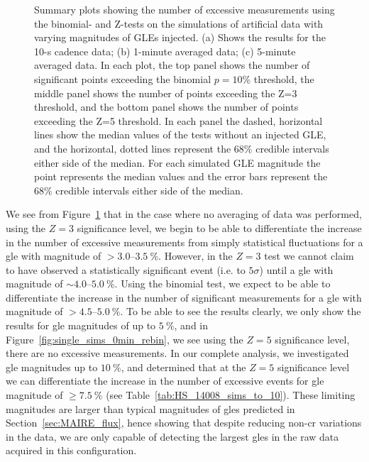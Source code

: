\begin{figure}[!htbp!]
	\caption{Summary plots showing the number of excessive measurements using the binomial- and Z-tests on the simulations of artificial data with varying magnitudes of GLEs injected. (a) Shows the results for the 10-s cadence data; (b) 1-minute averaged data; (c) 5-minute averaged data. In each plot, the top panel shows the number of significant points exceeding the binomial $p = 10 \%$ threshold, the middle panel shows the number of points exceeding the Z=3 threshold, and the bottom panel shows the number of points exceeding the Z=5 threshold. In each panel the dashed, horizontal lines show the median values of the tests without an injected GLE, and the horizontal, dotted lines represent the $68 \%$ credible intervals either side of the median. For each simulated GLE magnitude the point represents the median values and the error bars represent the $68 \%$ credible intervals either side of the median.}
	\label{fig:single_HS14008_sims}
\end{figure}

We see from Figure~\ref{fig:single_HS14008_sims} that in the case where no averaging of data was performed, using the $Z=3$ significance level, we begin to be able to differentiate the increase in the number of excessive measurements from simply statistical fluctuations for a \gls{gle} with magnitude of $>3.0$--$3.5~\%$. However, in the $Z=3$ test we cannot claim to have observed a statistically significant event (i.e. to $5\sigma$) until a \gls{gle} with magnitude of $\sim$$4.0$--$5.0~\%$. Using the binomial test, we expect to be able to differentiate the increase in the number of significant measurements for a \gls{gle} with magnitude of $>4.5$--$5.0~\%$. To be able to see the results clearly, we only show the results for \gls{gle} magnitudes of up to $5~\%$, and in Figure~\ref{fig:single_sims_0min_rebin}, we see using the $Z=5$ significance level, there are no excessive measurements. In our complete analysis, we investigated \gls{gle} magnitudes up to $10~\%$, and determined that at the $Z=5$ significance level we can differentiate the increase in the number of excessive events for \gls{gle} magnitude of $\geq7.5~\%$ (see Table~\ref{tab:HS_14008_sims_to_10}). These limiting magnitudes are larger than typical magnitudes of \glspl{gle} predicted in Section~\ref{sec:MAIRE_flux}, hence showing that despite reducing non-\gls{cr} variations in the data, we are only capable of detecting the largest \glspl{gle} in the raw data acquired in this configuration.



